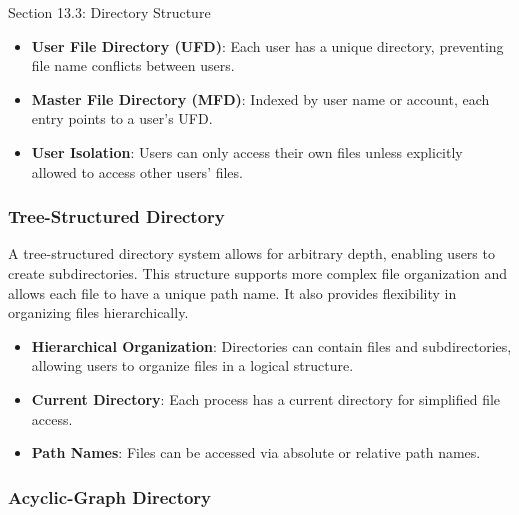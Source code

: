 \begin{notes}{Section 13.3: Directory Structure}
    \begin{highlight}
    
        \begin{itemize}
            \item \textbf{User File Directory (UFD)}: Each user has a unique directory, preventing file name conflicts between users.
            \item \textbf{Master File Directory (MFD)}: Indexed by user name or account, each entry points to a user's UFD.
            \item \textbf{User Isolation}: Users can only access their own files unless explicitly allowed to access other users' files.
        \end{itemize}
    
    \end{highlight}
    
    \subsubsection*{Tree-Structured Directory}
    
    A tree-structured directory system allows for arbitrary depth, enabling users to create subdirectories. This structure supports more complex file organization and allows each file to have a unique 
    path name. It also provides flexibility in organizing files hierarchically.
    
    \begin{highlight}
    
        \begin{itemize}
            \item \textbf{Hierarchical Organization}: Directories can contain files and subdirectories, allowing users to organize files in a logical structure.
            \item \textbf{Current Directory}: Each process has a current directory for simplified file access.
            \item \textbf{Path Names}: Files can be accessed via absolute or relative path names.
        \end{itemize}
    
    \end{highlight}
    
    \subsubsection*{Acyclic-Graph Directory}
    

\end{notes}
